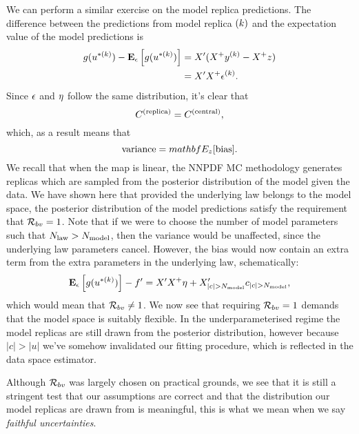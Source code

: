 We can perform a similar exercise on the model replica predictions. The difference
between the predictions from model replica $(k)$ and the expectation value
of the model predictions is
\begin{equation}
    \begin{split}
        g(u^{* (k)}) - \mathbf{E}_{\epsilon}\left[ g(u^{* (k)}) \right] &= X^\prime (X^+ y^{(k)} - X^+ z) \\
        &= X^\prime X^+ \epsilon^{(k)}.
    \end{split}
\end{equation}
Since $\epsilon$ and $\eta$ follow the same distribution, it's clear that
\begin{equation}
    C^{(\rm replica)} = C^{(\rm central)},
\end{equation}
which, as a result means that
\begin{equation}
    {\rm variance} = mathbf{E}_{z}[{\rm bias}].
\end{equation}
We recall that when the map is linear, the NNPDF MC methodology generates replicas
which are sampled from the posterior distribution of the model given the data.
We have shown here that provided the underlying law belongs to the model
space, the posterior distribution of the model predictions satisfy the
requirement that $\mathcal{R}_{bv} = 1$. Note that if we were to choose the
number of model parameters such that $N_{\rm law} > N_{\rm model}$, then the variance
would be unaffected, since the underlying law parameters cancel. However, the
bias would now contain an extra term from the extra parameters in the
underlying law, schematically:
\begin{equation}
    \begin{split}
        \mathbf{E}_{\epsilon}\left[ g(u^{* (k)}) \right] - f^\prime =
        X^\prime X^+ \eta + X^\prime_{|c| > N_{\rm model}} c_{|c| > N_{\rm model}},
    \end{split}
\end{equation}
which would mean that $\mathcal{R}_{bv} \neq 1$. We now see that requiring
$\mathcal{R}_{bv} = 1$ demands that the model space is suitably flexible. In the
underparameterised regime the model replicas are still drawn from the posterior
distribution, however because $\vert c \vert > \vert u \vert$
we've somehow invalidated our fitting procedure, which is reflected in the
data space estimator.

Although $\mathcal{R}_{bv}$ was largely chosen on practical
grounds, we see that it is still a stringent test that our assumptions are
correct and that the distribution our model replicas are drawn from is meaningful,
this is what we mean when we say {\em faithful uncertainties}.


